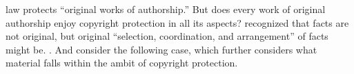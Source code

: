 
 law
protects ``original works of authorship.'' But does every work of original
authorship enjoy copyright protection in all its aspects? 
recognized that facts are not original, but original ``selection, coordination,
and arrangement'' of facts might be. . And
consider the following case, which further considers what material falls within
the ambit of copyright protection.

